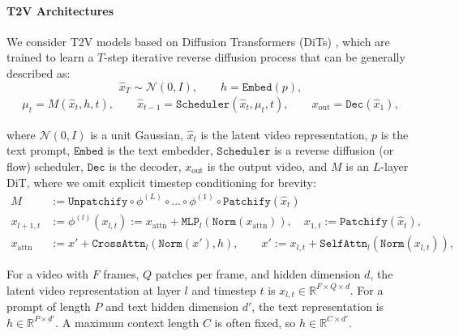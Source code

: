 \documentclass{article}
\begin{document}
\paragraph{T2V Architectures}
We consider T2V models based on Diffusion Transformers (DiTs) \cite{Peebles2022DiT}, which are trained to learn a $T$-step iterative reverse diffusion process that can be generally described as:
\begin{equation}
    \hat x_T \sim \mathcal{N}(0,I),\qquad
    h = \texttt{Embed}(p),
\end{equation}
\begin{equation}
    \begin{aligned}
        \mu_{t} = M(\hat x_t, h, t), \qquad
        \hat x_{t-1} = \texttt{Scheduler}(\hat x_t, \mu_t, t), \qquad
        x_{\text{out}} = \texttt{Dec}(\hat x_1),
    \end{aligned}
\end{equation}

where $\mathcal{N}(0,I)$ is a unit Gaussian, $\hat x_t$ is the latent video representation, $p$ is the text prompt, $\texttt{Embed}$ is the text embedder, $\texttt{Scheduler}$ is a reverse diffusion (or flow) scheduler, $\texttt{Dec}$ is the decoder, $x_\textrm{out}$ is the output video, and $M$ is an $L$-layer DiT, where we omit explicit timestep conditioning for brevity:
\begin{subequations}\label{eq:transformer}
\begin{align}
    M &:= \texttt{Unpatchify} \circ \phi^{(L)} \circ ... \circ \phi^{(1)} \circ \texttt{Patchify}(\hat x_t)\label{eq:transformer_M} \\
    x_{l+1,t} &:= \phi^{(l)}(x_{l,t}) := x_{\text{attn}} + \texttt{MLP}_l(\texttt{Norm}(x_{\text{attn}})), \quad x_{1,t}:= \texttt{Patchify}(\hat x_t),\label{eq:transformer_dynamics} \\
    x_{\text{attn}} &:= x' + \texttt{CrossAttn}_l(\texttt{Norm}(x'), h), \qquad
    x' := x_{l,t} + \texttt{SelfAttn}_l(\texttt{Norm}(x_{l,t}))\label{eq:transformer_z},
\end{align}
\end{subequations}

For a video with $F$ frames, $Q$ patches per frame, and hidden dimension $d$, the latent video representation at layer $l$ and timestep $t$ is $x_{l,t} \in \mathbb{R}^{F \times Q \times d}$. For a prompt of length $P$ and text hidden dimension $d'$, the text representation is $h \in \mathbb{R}^{P \times d'}$. A maximum context length $C$ is often fixed, so $h \in \mathbb{R}^{C \times d'}$.
\end{document}
